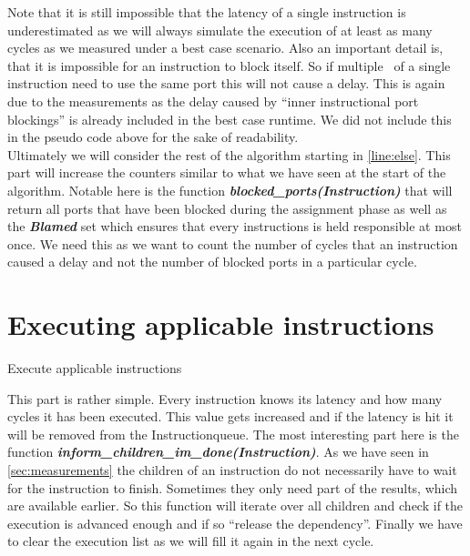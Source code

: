 Note that it is still impossible that the latency of a single instruction is underestimated as we will always simulate the execution of at least as many cycles as we measured under a best case scenario. Also an important detail is, that it is impossible for an instruction to block itself. So if multiple \microops\ of a single instruction need to use the same port this will not cause a delay. This is again due to the measurements as the delay caused by ``inner instructional port blockings'' is already included in the best case runtime. We did not include this in the pseudo code above for the sake of readability.\\

Ultimately we will consider the rest of the algorithm starting in \autoref{line:else}. This part will increase the counters similar to what we have seen at the start of the algorithm. Notable here is the function \textbf{\emph{blocked\_ports(Instruction)}} that will return all ports that have been blocked during the assignment phase as well as the \textbf{\emph{Blamed}} set which ensures that every instructions is held responsible at most once. We need this as we want to count the number of cycles that an instruction caused a delay and not the number of blocked ports in a particular cycle.



\section{Executing applicable instructions}
\label{sec:execute}

\begin{algorithm}[H]
    \SetAlgoLined
    \caption{Execute applicable instructions}
    \label{alg:execute}
\end{algorithm}

This part is rather simple. Every instruction knows its latency and how many cycles it has been executed. This value gets increased and if the latency is hit it will be removed from the Instructionqueue. The most interesting part here is the function \textbf{\emph{inform\_children\_im\_done(Instruction)}}. As we have seen in \autoref{sec:measurements} the children of an instruction do not necessarily have to wait for the instruction to finish. Sometimes they only need part of the results, which are available earlier. So this function will iterate over all children and check if the execution is advanced enough and if so ``release the dependency''. Finally we have to clear the execution list as we will fill it again in the next cycle.

